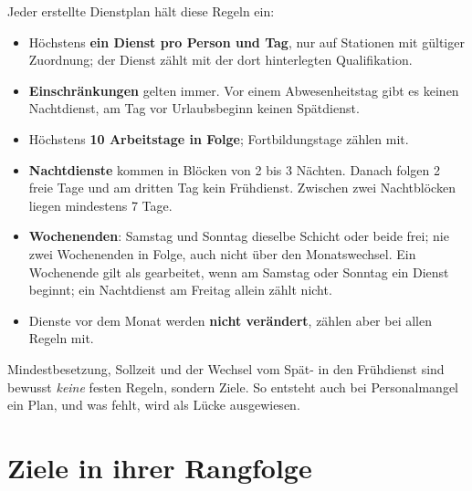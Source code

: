 \documentclass[11pt]{combiArticle}
\begin{document}
Jeder erstellte Dienstplan hält diese Regeln ein:
\begin{itemize}
  \item Höchstens \textbf{ein Dienst pro Person und Tag}, nur auf Stationen mit gültiger Zuordnung; der Dienst zählt
        mit der dort hinterlegten Qualifikation.
  \item \textbf{Einschränkungen} gelten immer. Vor einem Abwesenheitstag gibt es keinen Nachtdienst, am Tag vor
        Urlaubsbeginn keinen Spätdienst.
  \item Höchstens \textbf{10 Arbeitstage in Folge}; Fortbildungstage zählen mit.
  \item \textbf{Nachtdienste} kommen in Blöcken von 2 bis 3 Nächten. Danach folgen 2 freie Tage und am dritten Tag
        kein Frühdienst. Zwischen zwei Nachtblöcken liegen mindestens 7 Tage.
  \item \textbf{Wochenenden}: Samstag und Sonntag dieselbe Schicht oder beide frei; nie zwei Wochenenden in Folge,
        auch nicht über den Monatswechsel. Ein Wochenende gilt als gearbeitet, wenn am Samstag oder Sonntag ein
        Dienst beginnt; ein Nachtdienst am Freitag allein zählt nicht.
  \item Dienste vor dem Monat werden \textbf{nicht verändert}, zählen aber bei allen Regeln mit.
\end{itemize}

Mindestbesetzung, Sollzeit und der Wechsel vom Spät- in den Frühdienst sind bewusst \emph{keine} festen
Regeln, sondern Ziele. So entsteht auch bei Personalmangel ein Plan, und was fehlt, wird als Lücke ausgewiesen.

\section{Ziele in ihrer Rangfolge}
\end{document}
